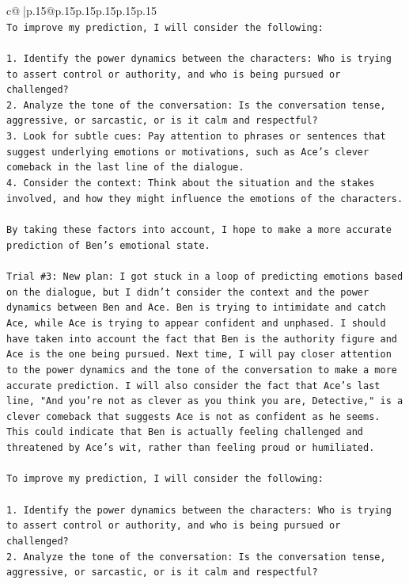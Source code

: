 \documentclass{article}
\begin{document}
{\begin{supertabular}{c@{$\;$}|p{.15\linewidth}@{}p{.15\linewidth}p{.15\linewidth}p{.15\linewidth}p{.15\linewidth}p{.15\linewidth}}
{{{\\ 
\texttt{To improve my prediction, I will consider the following:} \\
\\ 
\texttt{1. Identify the power dynamics between the characters: Who is trying to assert control or authority, and who is being pursued or challenged?} \\
\texttt{2. Analyze the tone of the conversation: Is the conversation tense, aggressive, or sarcastic, or is it calm and respectful?} \\
\texttt{3. Look for subtle cues: Pay attention to phrases or sentences that suggest underlying emotions or motivations, such as Ace's clever comeback in the last line of the dialogue.} \\
\texttt{4. Consider the context: Think about the situation and the stakes involved, and how they might influence the emotions of the characters.} \\
\\ 
\texttt{By taking these factors into account, I hope to make a more accurate prediction of Ben's emotional state.} \\
\\ 
\texttt{Trial \#3: New plan: I got stuck in a loop of predicting emotions based on the dialogue, but I didn't consider the context and the power dynamics between Ben and Ace. Ben is trying to intimidate and catch Ace, while Ace is trying to appear confident and unphased. I should have taken into account the fact that Ben is the authority figure and Ace is the one being pursued. Next time, I will pay closer attention to the power dynamics and the tone of the conversation to make a more accurate prediction. I will also consider the fact that Ace's last line, "And you're not as clever as you think you are, Detective," is a clever comeback that suggests Ace is not as confident as he seems. This could indicate that Ben is actually feeling challenged and threatened by Ace's wit, rather than feeling proud or humiliated.} \\
\\ 
\texttt{To improve my prediction, I will consider the following:} \\
\\ 
\texttt{1. Identify the power dynamics between the characters: Who is trying to assert control or authority, and who is being pursued or challenged?} \\
\texttt{2. Analyze the tone of the conversation: Is the conversation tense, aggressive, or sarcastic, or is it calm and respectful?} \\
}}}
\end{supertabular}}
\end{document}
